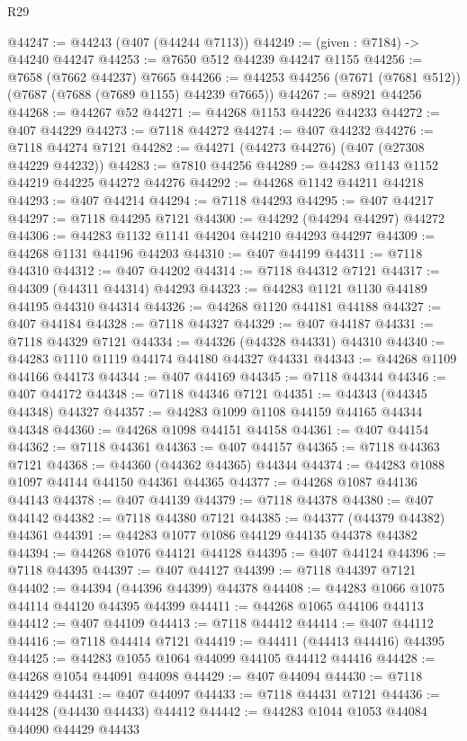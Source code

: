 \begin{lexlean}{R29}
\begin{coremodule}
@44247 := @44243 (@407 (@44244 @7113))
@44249 := (given : @7184) -> @44240 @44247
@44253 := @7650 @512 @44239 @44247 @1155
@44256 := @7658 (@7662 @44237) @7665
@44266 := @44253 @44256 (@7671 (@7681 @512)) (@7687 (@7688 (@7689 @1155) @44239 @7665))
@44267 := @8921 @44256
@44268 := @44267 @52
@44271 := @44268 @1153 @44226 @44233
@44272 := @407 @44229
@44273 := @7118 @44272
@44274 := @407 @44232
@44276 := @7118 @44274 @7121
@44282 := @44271 (@44273 @44276) (@407 (@27308 @44229 @44232))
@44283 := @7810 @44256
@44289 := @44283 @1143 @1152 @44219 @44225 @44272 @44276
@44292 := @44268 @1142 @44211 @44218
@44293 := @407 @44214
@44294 := @7118 @44293
@44295 := @407 @44217
@44297 := @7118 @44295 @7121
@44300 := @44292 (@44294 @44297) @44272
@44306 := @44283 @1132 @1141 @44204 @44210 @44293 @44297
@44309 := @44268 @1131 @44196 @44203
@44310 := @407 @44199
@44311 := @7118 @44310
@44312 := @407 @44202
@44314 := @7118 @44312 @7121
@44317 := @44309 (@44311 @44314) @44293
@44323 := @44283 @1121 @1130 @44189 @44195 @44310 @44314
@44326 := @44268 @1120 @44181 @44188
@44327 := @407 @44184
@44328 := @7118 @44327
@44329 := @407 @44187
@44331 := @7118 @44329 @7121
@44334 := @44326 (@44328 @44331) @44310
@44340 := @44283 @1110 @1119 @44174 @44180 @44327 @44331
@44343 := @44268 @1109 @44166 @44173
@44344 := @407 @44169
@44345 := @7118 @44344
@44346 := @407 @44172
@44348 := @7118 @44346 @7121
@44351 := @44343 (@44345 @44348) @44327
@44357 := @44283 @1099 @1108 @44159 @44165 @44344 @44348
@44360 := @44268 @1098 @44151 @44158
@44361 := @407 @44154
@44362 := @7118 @44361
@44363 := @407 @44157
@44365 := @7118 @44363 @7121
@44368 := @44360 (@44362 @44365) @44344
@44374 := @44283 @1088 @1097 @44144 @44150 @44361 @44365
@44377 := @44268 @1087 @44136 @44143
@44378 := @407 @44139
@44379 := @7118 @44378
@44380 := @407 @44142
@44382 := @7118 @44380 @7121
@44385 := @44377 (@44379 @44382) @44361
@44391 := @44283 @1077 @1086 @44129 @44135 @44378 @44382
@44394 := @44268 @1076 @44121 @44128
@44395 := @407 @44124
@44396 := @7118 @44395
@44397 := @407 @44127
@44399 := @7118 @44397 @7121
@44402 := @44394 (@44396 @44399) @44378
@44408 := @44283 @1066 @1075 @44114 @44120 @44395 @44399
@44411 := @44268 @1065 @44106 @44113
@44412 := @407 @44109
@44413 := @7118 @44412
@44414 := @407 @44112
@44416 := @7118 @44414 @7121
@44419 := @44411 (@44413 @44416) @44395
@44425 := @44283 @1055 @1064 @44099 @44105 @44412 @44416
@44428 := @44268 @1054 @44091 @44098
@44429 := @407 @44094
@44430 := @7118 @44429
@44431 := @407 @44097
@44433 := @7118 @44431 @7121
@44436 := @44428 (@44430 @44433) @44412
@44442 := @44283 @1044 @1053 @44084 @44090 @44429 @44433

\end{coremodule}
\end{lexlean}
